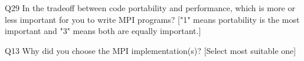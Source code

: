 \begin{description}%
\item{Q29} In the tradeoff between code portability and performance, which is more or less important for you to write MPI programs? ["1" means portability is the most important and "3" means both are equally important.]%
\item{Q13} Why did you choose the MPI implementation(s)? [Select most suitable one]%
\end{description}%
